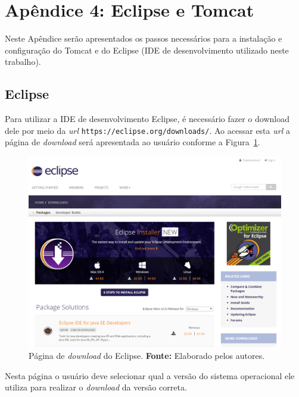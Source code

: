 \chapter*{Apêndice 4: Eclipse e Tomcat}
\label{apendice:eclipse_tomcat}

Neste Apêndice serão apresentados os passos necessários para a instalação e configuração do Tomcat e do Eclipse (IDE de desenvolvimento utilizado neste trabalho).

\section*{Eclipse}

Para utilizar a IDE de desenvolvimento Eclipse, é necessário fazer o download dele por meio da \textit{url} \texttt{https://eclipse.org/downloads/}. Ao acessar esta \textit{url} a página de \textit{download} será apresentada ao usuário conforme a Figura~\ref{fig:ap2:pagina_download_eclipse}.

\captionsetup[figure]{list=no}
\begin{figure}[h!]
	\centerline{\includegraphics[scale=0.4]{./imagens/apendices/pagina-download-eclipse.png}}
	\caption[Página de \textit{download} do Eclipse.]
	{Página de \textit{download} do Eclipse. \textbf{Fonte:} Elaborado pelos autores.}
	\label{fig:ap2:pagina_download_eclipse}
\end{figure}

Nesta página o usuário deve selecionar qual a versão do sistema operacional ele utiliza para realizar o \textit{download} da versão correta.

